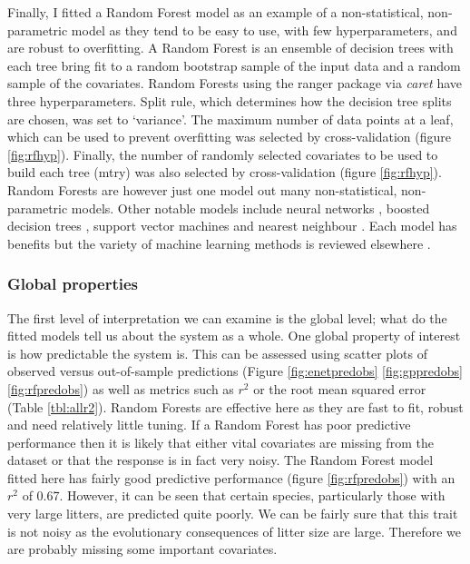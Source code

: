 \documentclass[10pt,]{article}
\begin{document}
Finally, I fitted a Random Forest model \citep{breiman2001random, wright2015ranger} as an example of a non-statistical, non-parametric model as they tend to be easy to use, with few hyperparameters, and are robust to overfitting. A Random Forest is an ensemble of decision trees with each tree bring fit to a random bootstrap sample of the input data and a random sample of the covariates. Random Forests using the ranger \citep{wright2015ranger} package via \emph{caret} have three hyperparameters. Split rule, which determines how the decision tree splits are chosen, was set to `variance'. The maximum number of data points at a leaf, which can be used to prevent overfitting was selected by cross-validation (figure \ref{fig:rfhyp}). Finally, the number of randomly selected covariates to be used to build each tree (mtry) was also selected by cross-validation (figure \ref{fig:rfhyp}). Random Forests are however just one model out many non-statistical, non-parametric models. Other notable models include neural networks \citep{neuralnets}, boosted decision trees \citep{friedman2001greedy}, support vector machines \citep{svm} and nearest neighbour \citep{knn}. Each model has benefits but the variety of machine learning methods is reviewed elsewhere \citep{crisci2012review}.

\subsubsection{Global properties}\label{global-properties}

The first level of interpretation we can examine is the global level; what do the fitted models tell us about the system as a whole. One global property of interest is how predictable the system is. This can be assessed using scatter plots of observed versus out-of-sample predictions (Figure \ref{fig:enetpredobs} \ref{fig:gppredobs} \ref{fig:rfpredobs}) as well as metrics such as \(r^2\) or the root mean squared error (Table \ref{tbl:allr2}). Random Forests are effective here as they are fast to fit, robust and need relatively little tuning. If a Random Forest has poor predictive performance then it is likely that either vital covariates are missing from the dataset or that the response is in fact very noisy. The Random Forest model fitted here has fairly good predictive performance (figure \ref{fig:rfpredobs}) with an \(r^2\) of 0.67. However, it can be seen that certain species, particularly those with very large litters, are predicted quite poorly. We can be fairly sure that this trait is not noisy as the evolutionary consequences of litter size are large. Therefore we are probably missing some important covariates.
\end{document}
